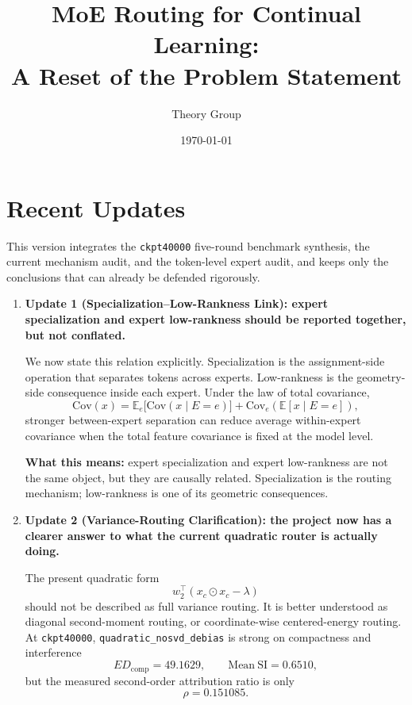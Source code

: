 \documentclass[11pt]{article}
\title{MoE Routing for Continual Learning:\\ A Reset of the Problem Statement}
\author{Theory Group}
\date{\today}
\begin{document}
\maketitle

\section{Recent Updates}

This version integrates the \texttt{ckpt40000} five-round benchmark synthesis, the current mechanism audit, and the token-level expert audit, and keeps only the conclusions that can already be defended rigorously.

\begin{enumerate}
    \item \textbf{Update 1 (Specialization--Low-Rankness Link): expert specialization and expert low-rankness should be reported together, but not conflated.}

    We now state this relation explicitly. Specialization is the assignment-side operation that separates tokens across experts. Low-rankness is the geometry-side consequence inside each expert. Under the law of total covariance,
    \[
    \mathrm{Cov}(x)
    =
    \mathbb{E}_{e}\!\big[\mathrm{Cov}(x\mid E=e)\big]
    +
    \mathrm{Cov}_{e}(\mathbb{E}[x\mid E=e]),
    \]
    stronger between-expert separation can reduce average within-expert covariance when the total feature covariance is fixed at the model level.

    \textbf{What this means:} expert specialization and expert low-rankness are not the same object, but they are causally related. Specialization is the routing mechanism; low-rankness is one of its geometric consequences.

    \item \textbf{Update 2 (Variance-Routing Clarification): the project now has a clearer answer to what the current quadratic router is actually doing.}

    The present quadratic form
    \[
    w_2^\top(x_c\odot x_c-\lambda)
    \]
    should not be described as full variance routing. It is better understood as diagonal second-moment routing, or coordinate-wise centered-energy routing. At \texttt{ckpt40000}, \texttt{quadratic\_nosvd\_debias} is strong on compactness and interference
    \[
    ED_{\mathrm{comp}} = 49.1629,\qquad \mathrm{Mean\ SI}=0.6510,
    \]
    but the measured second-order attribution ratio is only
    \[
    \rho = 0.151085.
    \]


\end{enumerate}
\end{document}
